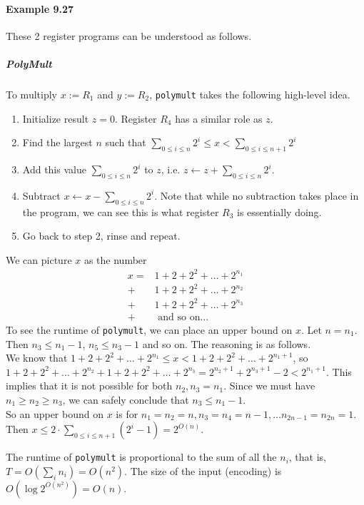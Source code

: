 \documentclass{article}
\begin{document}
\paragraph{Example 9.27} These 2 register programs can be understood as follows.

\subparagraph{PolyMult} To multiply $x:=R_1$ and $y:=R_2$, \texttt{polymult} takes the following high-level idea.

\begin{enumerate}
	\item Initialize result $z=0$. Register $R_4$ has a similar role as $z$.
	\item Find the largest $n$ such that $\sum_{0\leq i\leq n}2^i\leq x<\sum_{0\leq i\leq n+1}2^i$
	\item Add this value $\sum_{0\leq i\leq n}2^i$ to $z$, i.e. $z\gets z + \sum_{0\leq i\leq n}2^i$.
	\item Subtract $x\gets x-\sum_{0\leq i\leq n}2^i$. Note that while no subtraction takes place in the program, we can see this is what register $R_3$ is essentially doing.
	\item Go back to step 2, rinse and repeat.
\end{enumerate}
We can picture $x$ as the number
\begin{align*}
	x = &1 + 2 + 2^2 + \dots + 2^{n_1}\\
	+ &1 + 2 + 2^2 + \dots + 2^{n_2}\\
	+ &1 + 2 + 2^2 + \dots + 2^{n_3}\\
	+ &\text{ and so on...}
\end{align*}
To see the runtime of \texttt{polymult}, we can place an upper bound on $x$. Let $n=n_1$. Then $n_3\leq n_1-1$, $n_5\leq n_3-1$ and so on. The reasoning is as follows.\\
We know that $1 + 2 + 2^2 + \dots + 2^{n_1}\leq x < 1 + 2 + 2^2 + \dots + 2^{n_1+1}$, so $1 + 2 + 2^2 + \dots + 2^{n_2} + 1 + 2 + 2^2 + \dots + 2^{n_3} = 2^{n_2+1} + 2^{n_3+1} - 2 < 2^{n_1+1}$. This implies that it is not possible for both $n_2, n_3 = n_1$. Since we must have $n_1\geq n_2\geq n_3$, we can safely conclude that $n_3\leq n_1-1$.\\
So an upper bound on $x$ is for $n_1=n_2=n, n_3=n_4=n-1, \dots n_{2n-1}=n_{2n}=1$.
Then $x\leq 2\cdot \sum_{0\leq i\leq n+1}(2^i-1)=2^{O(n)}$.

The runtime of \texttt{polymult} is proportional to the sum of all the $n_i$, that is, $T=O(\sum_i n_i)=O(n^2)$. The size of the input (encoding) is $O(\log 2^{O(n^2)}) = O(n)$.
\end{document}
